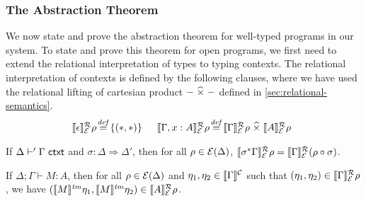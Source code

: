 \subsubsection{The Abstraction Theorem}
\label{sec:abstraction-theorem}

We now state and prove the abstraction theorem for well-typed programs
in our system. To state and prove this theorem for open programs, we
first need to extend the relational interpretation of types to typing
contexts. The relational interpretation of contexts is defined by the
following clauses, where we have used the relational lifting of
cartesian product $-\mathrel{\widehat\times}-$ defined in
\autoref{sec:relational-semantics}.
\begin{displaymath}
  \begin{array}{@{}l@{\hspace{0.1em}\isDefinedAs\hspace{0.1em}}l@{\hspace{1.5em}}l@{\hspace{0.1em}\isDefinedAs\hspace{0.1em}}l}
    \rsem{\epsilon}{\relEnv{E}}{\rho} & \{(*,*)\} &
    \rsem{\Gamma, x : A}{\relEnv{E}}{\rho} & \rsem{\Gamma}{\relEnv{E}}\rho \relTimes \rsem{A}{\relEnv{E}}\rho
  \end{array}
\end{displaymath}
\begin{lemma}\label{lem:ctxtsubst-rel}
  If $\Delta \vdash' \Gamma \textsf{ ctxt}$ and $\sigma : \Delta \Rightarrow
  \Delta'$, then for all $\rho \in \mathcal{E}(\Delta)$,
  $\llbracket \sigma^*\Gamma \rrbracket^{\mathcal{R}}_{\mathcal{E}}{\rho} =
  \llbracket \Gamma \rrbracket^{\mathcal{R}}_{\mathcal{E}}{(\rho \circ \sigma)}$.
\end{lemma}

\begin{theorem}[Abstraction]\label{thm:abstraction}
  If $\Delta; \Gamma \vdash M : A$, then for all $\rho \in
  \mathcal{E}(\Delta)$ and $\eta_1, \eta_2 \in \llbracket \Gamma \rrbracket^{\mathcal{C}}$ such
  that $(\eta_1, \eta_2) \in \llbracket \Gamma \rrbracket^{\mathcal{R}}_{\mathcal{E}}{\rho}$, we have
  $(\llbracket M \rrbracket^{\mathit{tm}}\eta_1, \llbracket M \rrbracket^{\mathit{tm}}\eta_2) \in \llbracket A \rrbracket^{\mathcal{R}}_{\mathcal{E}}{\rho}$.
\end{theorem}

